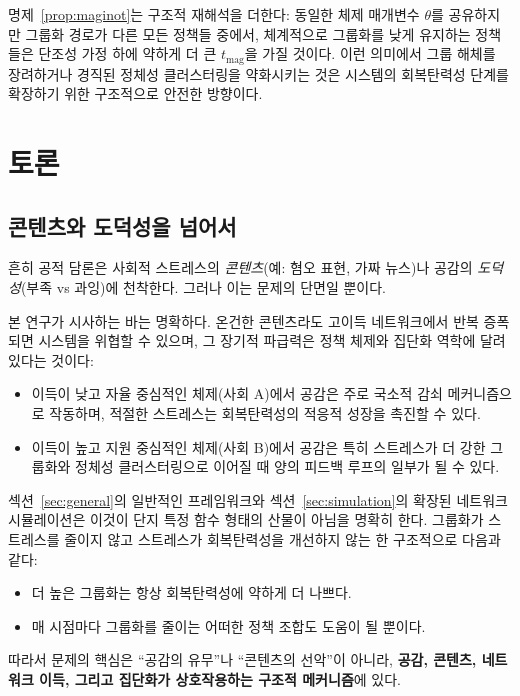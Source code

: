 \documentclass[11pt]{article}
\theoremstyle{plain}
\begin{document}
명제~\ref{prop:maginot}는 구조적 재해석을 더한다: 동일한 체제 매개변수 $\theta$를 공유하지만 그룹화 경로가 다른 모든 정책들 중에서, 체계적으로 그룹화를 낮게 유지하는 정책들은 단조성 가정 하에 약하게 더 큰 $t_{\text{mag}}$을 가질 것이다.
이런 의미에서 그룹 해체를 장려하거나 경직된 정체성 클러스터링을 약화시키는 것은 시스템의 회복탄력성 단계를 확장하기 위한 구조적으로 안전한 방향이다.

\section{토론}

\subsection{콘텐츠와 도덕성을 넘어서}

흔히 공적 담론은 사회적 스트레스의 \emph{콘텐츠}(예: 혐오 표현, 가짜 뉴스)나 공감의 \emph{도덕성}(부족 vs 과잉)에 천착한다.
그러나 이는 문제의 단면일 뿐이다.

본 연구가 시사하는 바는 명확하다. 온건한 콘텐츠라도 고이득 네트워크에서 반복 증폭되면 시스템을 위협할 수 있으며, 그 장기적 파급력은 정책 체제와 집단화 역학에 달려 있다는 것이다:
\begin{itemize}
  \item 이득이 낮고 자율 중심적인 체제(사회 A)에서 공감은 주로 국소적 감쇠 메커니즘으로 작동하며, 적절한 스트레스는 회복탄력성의 적응적 성장을 촉진할 수 있다.
  \item 이득이 높고 지원 중심적인 체제(사회 B)에서 공감은 특히 스트레스가 더 강한 그룹화와 정체성 클러스터링으로 이어질 때 양의 피드백 루프의 일부가 될 수 있다.
\end{itemize}

섹션~\ref{sec:general}의 일반적인 프레임워크와 섹션~\ref{sec:simulation}의 확장된 네트워크 시뮬레이션은 이것이 단지 특정 함수 형태의 산물이 아님을 명확히 한다.
그룹화가 스트레스를 줄이지 않고 스트레스가 회복탄력성을 개선하지 않는 한 구조적으로 다음과 같다:
\begin{itemize}
  \item 더 높은 그룹화는 항상 회복탄력성에 약하게 더 나쁘다.
  \item 매 시점마다 그룹화를 줄이는 어떠한 정책 조합도 도움이 될 뿐이다.
\end{itemize}

따라서 문제의 핵심은 ``공감의 유무''나 ``콘텐츠의 선악''이 아니라, \textbf{공감, 콘텐츠, 네트워크 이득, 그리고 집단화가 상호작용하는 구조적 메커니즘}에 있다.
\end{document}
